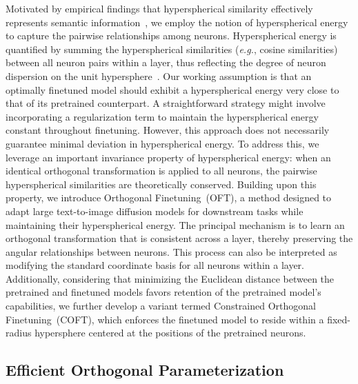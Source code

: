 \begin{itemize}[leftmargin=*,nosep]
Motivated by empirical findings that hyperspherical similarity effectively represents semantic information~\cite{liu2017deep,liu2018decoupled,chen2020angular}, we employ the notion of hyperspherical energy~\cite{liu2018learning} to capture the pairwise relationships among neurons. Hyperspherical energy is quantified by summing the hyperspherical similarities (\emph{e.g.}, cosine similarities) between all neuron pairs within a layer, thus reflecting the degree of neuron dispersion on the unit hypersphere~\cite{liu2021learning}. Our working assumption is that an optimally finetuned model should exhibit a hyperspherical energy very close to that of its pretrained counterpart. A straightforward strategy might involve incorporating a regularization term to maintain the hyperspherical energy constant throughout finetuning. However, this approach does not necessarily guarantee minimal deviation in hyperspherical energy. To address this, we leverage an important invariance property of hyperspherical energy: when an identical orthogonal transformation is applied to all neurons, the pairwise hyperspherical similarities are theoretically conserved. Building upon this property, we introduce Orthogonal Finetuning~(OFT), a method designed to adapt large text-to-image diffusion models for downstream tasks while maintaining their hyperspherical energy. The principal mechanism is to learn an orthogonal transformation that is consistent across a layer, thereby preserving the angular relationships between neurons. This process can also be interpreted as modifying the standard coordinate basis for all neurons within a layer. Additionally, considering that minimizing the Euclidean distance between the pretrained and finetuned models favors retention of the pretrained model’s capabilities, we further develop a variant termed Constrained Orthogonal Finetuning~(COFT), which enforces the finetuned model to reside within a fixed-radius hypersphere centered at the positions of the pretrained neurons.

\subsection{Efficient Orthogonal Parameterization}\label{sect:eff_ortho}


\end{itemize}
